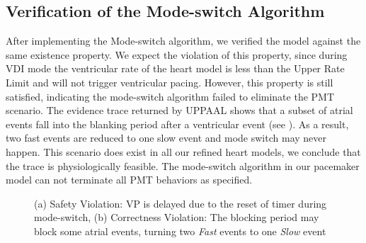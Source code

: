 \subsection{Verification of the Mode-switch Algorithm}
After implementing the Mode-switch algorithm, we verified the model against the same existence property. We expect the violation of this property, since during VDI mode the ventricular rate of the heart model is less than the Upper Rate Limit and will not trigger ventricular pacing. However, this property is still satisfied, indicating the mode-switch algorithm failed to eliminate the PMT scenario. The evidence trace returned by UPPAAL shows that a subset of atrial events fall into the blanking period after a ventricular event (see ). As a result, two fast events are reduced to one slow event and mode switch may never happen. This scenario does exist in all our refined heart models, we conclude that the trace is physiologically feasible. The mode-switch algorithm in our pacemaker model can not terminate all PMT behaviors as specified.
\begin{figure}
\centering
		\vspace{-10pt}
	\caption{(a) Safety Violation: VP is delayed due to the reset of timer during mode-switch, (b) Correctness Violation: The blocking period may block some atrial events, turning two \emph{Fast} events to one \emph{Slow} event \cite{TACAS12}}
\vspace{-20pt}
\end{figure} 
